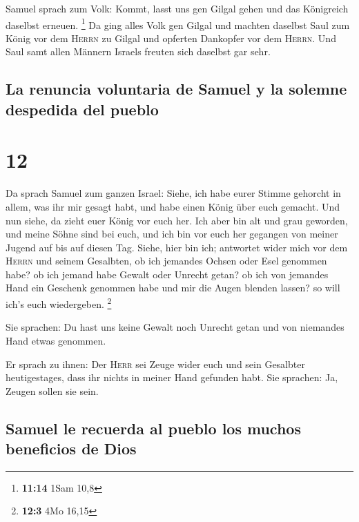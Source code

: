  Samuel sprach zum Volk: Kommt, lasst uns gen Gilgal
gehen und das Königreich daselbst erneuen. \footnote{\textbf{11:14} 1Sam
  10,8}  Da ging alles Volk gen Gilgal und machten
daselbst Saul zum König vor dem \textsc{Herrn} zu Gilgal und opferten
Dankopfer vor dem \textsc{Herrn}. Und Saul samt allen Männern Israels
freuten sich daselbst gar sehr.

\hypertarget{la-renuncia-voluntaria-de-samuel-y-la-solemne-despedida-del-pueblo}{%
\subsection{La renuncia voluntaria de Samuel y la solemne despedida del
pueblo}\label{la-renuncia-voluntaria-de-samuel-y-la-solemne-despedida-del-pueblo}}

\hypertarget{section-11}{%
\section{12}\label{section-11}}

 Da sprach Samuel zum ganzen Israel: Siehe, ich habe eurer
Stimme gehorcht in allem, was ihr mir gesagt habt, und habe einen König
über euch gemacht.  Und nun siehe, da zieht euer König vor
euch her. Ich aber bin alt und grau geworden, und meine Söhne sind bei
euch, und ich bin vor euch her gegangen von meiner Jugend auf bis auf
diesen Tag.  Siehe, hier bin ich; antwortet wider mich vor
dem \textsc{Herrn} und seinem Gesalbten, ob ich jemandes Ochsen oder
Esel genommen habe? ob ich jemand habe Gewalt oder Unrecht getan? ob ich
von jemandes Hand ein Geschenk genommen habe und mir die Augen blenden
lassen? so will ich's euch wiedergeben. \footnote{\textbf{12:3} 4Mo
  16,15}

 Sie sprachen: Du hast uns keine Gewalt noch Unrecht getan
und von niemandes Hand etwas genommen.

 Er sprach zu ihnen: Der \textsc{Herr} sei Zeuge wider
euch und sein Gesalbter heutigestages, dass ihr nichts in meiner Hand
gefunden habt. Sie sprachen: Ja, Zeugen sollen sie sein.

\hypertarget{samuel-le-recuerda-al-pueblo-los-muchos-beneficios-de-dios}{%
\subsection{Samuel le recuerda al pueblo los muchos beneficios de
Dios}\label{samuel-le-recuerda-al-pueblo-los-muchos-beneficios-de-dios}}

